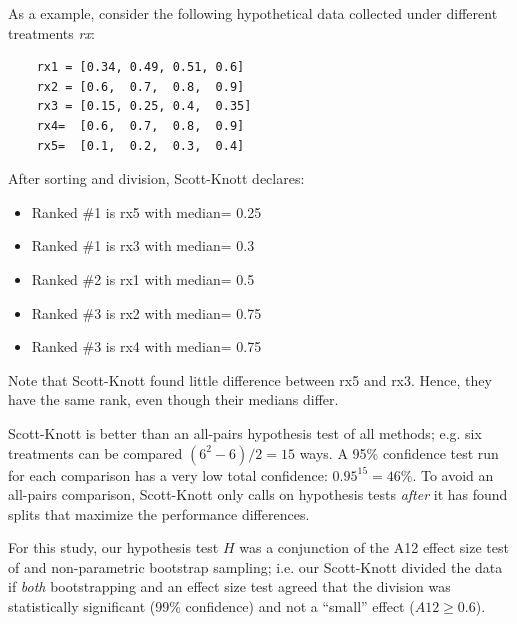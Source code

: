 \documentclass[conference]{IEEEtran}
\newcommand{\bi}{\begin{itemize}}
\newcommand{\ei}{\end{itemize}}
\begin{document}
As a example, consider the following hypothetical data collected under different treatments {\em rx}:

{\scriptsize \begin{verbatim}
	rx1 = [0.34, 0.49, 0.51, 0.6]
	rx2 = [0.6,  0.7,  0.8,  0.9]
	rx3 = [0.15, 0.25, 0.4,  0.35]
	rx4=  [0.6,  0.7,  0.8,  0.9]
	rx5=  [0.1,  0.2,  0.3,  0.4]
	\end{verbatim}}
\noindent
After sorting and division, Scott-Knott declares:
\bi
\item Ranked \#1 is rx5 with median= 0.25
\item Ranked \#1 is rx3 with median= 0.3
\item Ranked \#2 is rx1 with median= 0.5
\item Ranked \#3 is rx2 with median= 0.75
\item Ranked \#3 is rx4 with median= 0.75
\ei
Note that Scott-Knott found  little
difference between rx5 and rx3. Hence,
they have the same rank, even though their medians differ.

Scott-Knott is better than an 
all-pairs hypothesis test of all methods; e.g. six treatments
can be compared \mbox{$(6^2-6)/2=15$} ways. 
A 95\% confidence test run for each comparison has  a very low total confidence: 
\mbox{$0.95^{15} = 46$}\%.
To avoid an all-pairs comparison, Scott-Knott only calls on hypothesis
tests {\em after} it has found splits that maximize the performance differences.

For this study, our hypothesis test $H$ was a
conjunction of the A12 effect size test of  and
non-parametric bootstrap sampling; i.e. our
Scott-Knott divided the data if {\em both}
bootstrapping and an effect size test agreed that
the division was statistically significant (99\%
confidence) and not a ``small'' effect ($A12 \ge
0.6$).
\end{document}
